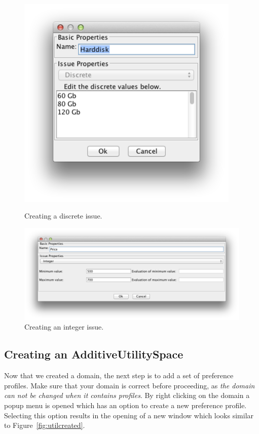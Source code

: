 \documentclass[]{article}
\begin{document}
\begin{figure}[ht]
\center
\begin{minipage}[b]{0.35\linewidth}
	\includegraphics[width=0.95\textwidth]{media/image7a.png}
\caption{Creating a discrete issue.}
\label{fig:createIssueD}
\end{minipage}
\begin{minipage}[b]{0.55\linewidth}
	\includegraphics[width=1.0\textwidth]{media/image7b.png}
\caption{Creating an integer issue.}\label{fig:createIssueI}
\end{minipage}
\end{figure}

\FloatBarrier

\subsection{Creating an AdditiveUtilitySpace}\label{sec:createAdditive}
Now that we created a domain, the next step is to add a set of preference profiles. Make sure that your domain is correct before proceeding, as \textit{the domain can not be changed when it contains profiles}. By right clicking on the domain a popup menu is opened which has an option to create a new preference profile. Selecting this option results in the opening of a new window which looks similar to Figure~\ref{fig:utilcreated}.
\end{document}
